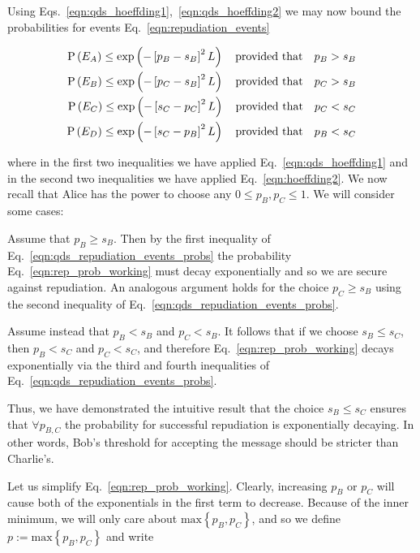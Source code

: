 Using Eqs.~\ref{eqn:qds_hoeffding1},~\ref{eqn:qds_hoeffding2} we may now bound the probabilities for events Eq.~\ref{eqn:repudiation_events}

\begin{align}\label{eqn:qds_repudiation_events_probs}
\text{P}\left(E_A\right) \le \text{exp}\left( -\left[p_B - s_B\right]^2 L \right) \qq{provided that} p_B > s_B \notag \\
\text{P}\left(E_B\right) \le \text{exp}\left( -\left[p_C - s_B\right]^2 L \right) \qq{provided that} p_C > s_B \notag \\
\text{P}\left(E_C\right) \le \text{exp}\left( -\left[s_C - p_C\right]^2 L \right) \qq{provided that} p_C < s_C \notag \\
\text{P}\left(E_D\right) \le \text{exp}\left( -\left[s_C - p_B\right]^2 L \right) \qq{provided that} p_B < s_C
\end{align}

\noindent where in the first two inequalities we have applied Eq.~\ref{eqn:qds_hoeffding1} and in the second two inequalities we have applied Eq.~\ref{eqn:hoeffding2}. We now recall that Alice has the power to choose any $0 \le p_B, p_C \le 1$. We will consider some cases:

\noindent Assume that $p_B \ge s_B$. Then by the first inequality of Eq.~\ref{eqn:qds_repudiation_events_probs} the probability Eq.~\ref{eqn:rep_prob_working} must decay exponentially %
and so we are secure against repudiation. An analogous argument holds for the choice $p_C \ge s_B$ using the second inequality of Eq.~\ref{eqn:qds_repudiation_events_probs}.

\noindent Assume instead that $p_B < s_B$ and $p_C < s_B$. It follows that if we choose $s_B \le s_C$, then $p_B < s_C$ and $p_C < s_C$, and therefore Eq.~\ref{eqn:rep_prob_working} decays exponentially via the third and fourth inequalities of Eq.~\ref{eqn:qds_repudiation_events_probs}.

Thus, we have demonstrated the intuitive result that the choice $s_B \le s_C$ ensures that $\forall p_{B, C}$ the probability for successful repudiation is exponentially decaying. In other words, Bob's threshold for accepting the message should be stricter than Charlie's.

Let us simplify Eq.~\ref{eqn:rep_prob_working}. Clearly, increasing $p_B$ or $p_C$ will cause both of the exponentials in the first term to decrease. Because of the inner minimum, we will only care about $\text{max}\left\{p_B, p_C\right\}$, and so we define $p := \text{max}\left\{p_B, p_C\right\}$ and write

